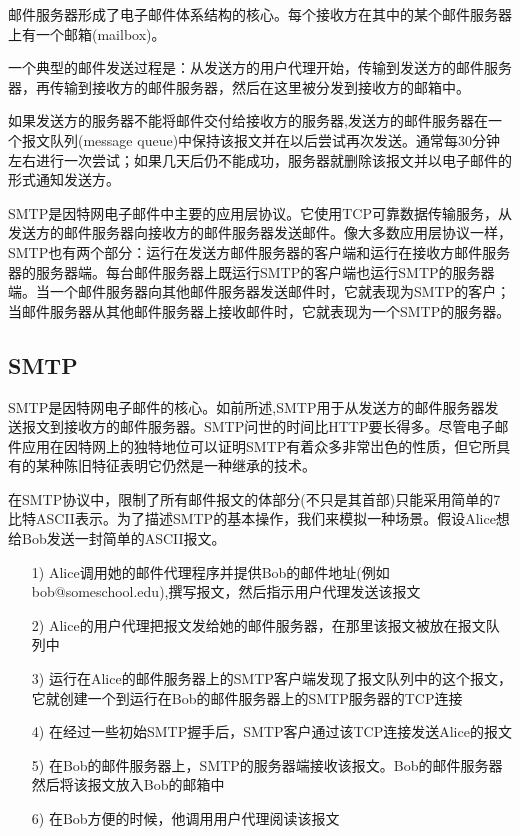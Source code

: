     邮件服务器形成了电子邮件体系结构的核心。每个接收方在其中的某个邮件服务器上有一个邮箱(mailbox)。

    一个典型的邮件发送过程是：从发送方的用户代理开始，传输到发送方的邮件服务器，再传输到接收方的邮件服务器，然后在这里被分发到接收方的邮箱中。

    如果发送方的服务器不能将邮件交付给接收方的服务器,发送方的邮件服务器在一个报文队列(message queue)中保持该报文并在以后尝试再次发送。通常每30分钟左右进行一次尝试；如果几天后仍不能成功，服务器就删除该报文并以电子邮件的形式通知发送方。

    SMTP是因特网电子邮件中主要的应用层协议。它使用TCP可靠数据传输服务，从发送方的邮件服务器向接收方的邮件服务器发送邮件。像大多数应用层协议一样，SMTP也有两个部分：运行在发送方邮件服务器的客户端和运行在接收方邮件服务器的服务器端。每台邮件服务器上既运行SMTP的客户端也运行SMTP的服务器端。当一个邮件服务器向其他邮件服务器发送邮件时，它就表现为SMTP的客户；当邮件服务器从其他邮件服务器上接收邮件时，它就表现为一个SMTP的服务器。

\subsection{SMTP}

    SMTP是因特网电子邮件的核心。如前所述,SMTP用于从发送方的邮件服务器发送报文到接收方的邮件服务器。SMTP问世的时间比HTTP要长得多。尽管电子邮件应用在因特网上的独特地位可以证明SMTP有着众多非常岀色的性质，但它所具有的某种陈旧特征表明它仍然是一种继承的技术。

    在SMTP协议中，限制了所有邮件报文的体部分(不只是其首部)只能采用简单的7比特ASCII表示。为了描述SMTP的基本操作，我们来模拟一种场景。假设Alice想给Bob发送一封简单的ASCII报文。

\begin{itemize}
    \item [1)] Alice调用她的邮件代理程序并提供Bob的邮件地址(例如bob@someschool.edu),撰写报文，然后指示用户代理发送该报文
    \item [2)] Alice的用户代理把报文发给她的邮件服务器，在那里该报文被放在报文队列中
    \item [3)] 运行在Alice的邮件服务器上的SMTP客户端发现了报文队列中的这个报文，它就创建一个到运行在Bob的邮件服务器上的SMTP服务器的TCP连接
    \item [4)] 在经过一些初始SMTP握手后，SMTP客户通过该TCP连接发送Alice的报文
    \item [5)] 在Bob的邮件服务器上，SMTP的服务器端接收该报文。Bob的邮件服务器然后将该报文放入Bob的邮箱中
    \item [6)] 在Bob方便的时候，他调用用户代理阅读该报文
\end{itemize}

